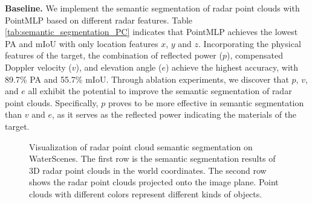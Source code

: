 \documentclass[lettersize,journal]{IEEEtran}
\begin{document}
\textbf{Baseline.} We implement the semantic segmentation of radar point clouds with PointMLP based on different radar features. Table \ref{tab:semantic_segmentation_PC} indicates that PointMLP achieves the lowest PA and mIoU with only location features $x$, $y$ and $z$. 
Incorporating the physical features of the target, the combination of reflected power ($p$), compensated Doppler velocity ($v$), and elevation angle ($e$) achieve the highest accuracy, with 89.7\% PA and 55.7\% mIoU. 
Through ablation experiments, we discover that $p$, $v$, and $e$ all exhibit the potential to improve the semantic segmentation of radar point clouds.
Specifically, $p$ proves to be more effective in semantic segmentation than $v$ and $e$, as it serves as the reflected power indicating the materials of the target.




\begin{figure}[htbp]
\centering
{}
\quad
\hspace{-7mm}
\quad
\hspace{-7mm}
\vspace{-2mm}
\centering

\quad
\hspace{-6.8mm}
\quad
\hspace{-6.8mm}
\caption{Visualization of radar point cloud semantic segmentation on WaterScenes. The first row is the semantic segmentation results of 3D radar point clouds in the world coordinates. The second row shows the radar point clouds projected onto the image plane. Point clouds with different colors represent different kinds of objects.}
\label{fig:radar-pc-seg}
\end{figure}
\end{document}
